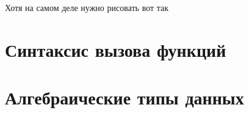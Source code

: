 \documentclass[aspectratio=169
  , xcolor={svgnames}
  , hyperref=
      { colorlinks
      , urlcolor=DarkBlue
      }
  , russian  %
  ]{beamer}
\begin{document}
\begin{frame}{Хотя на самом деле нужно рисовать вот так}
\end{frame}

\section{Синтаксис вызова функций}







\section{Алгебраические типы данных}
\end{document}
